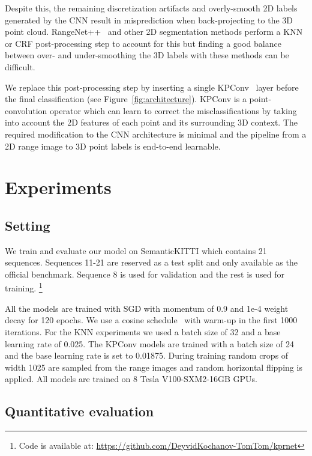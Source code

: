 \documentclass[runningheads]{llncs}
\begin{document}
Despite this, the remaining discretization artifacts and overly-smooth 2D labels generated by the CNN result in misprediction when back-projecting to the 3D point cloud. RangeNet++~\cite{rangenet} and other 2D segmentation methods perform a KNN or CRF post-processing step to account for this but finding a good balance between over- and under-smoothing the 3D labels with these methods can be difficult.

We replace this post-processing step by inserting a single KPConv~\cite{KPConv} layer before the final classification (see Figure~\ref{fig:architecture}). KPConv is a point-convolution operator which can learn to correct the misclassifications by taking into account the 2D features of each point and its surrounding 3D context. The required modification to the CNN architecture is minimal and the pipeline from a 2D range image to 3D point labels is end-to-end learnable.

\section{Experiments}
\subsection{Setting}
We train and evaluate our model on SemanticKITTI which contains 21 sequences. Sequences 11-21 are reserved as a test split and only available as the official benchmark. Sequence 8 is used for validation and the rest is used for training. \footnote{Code is available at: \url{https://github.com/DeyvidKochanov-TomTom/kprnet}} 

All the models are trained with SGD with momentum of 0.9 and 1e-4 weight decay for 120 epochs. We use a cosine schedule~\cite{cosine} with warm-up in the first 1000 iterations. For the KNN experiments we used a batch size of 32 and a base learning rate of 0.025. The KPConv models are trained with a batch size of 24 and the base learning rate is set to 0.01875. During training random crops of width 1025 are sampled from the range images and random horizontal flipping is applied. All models are trained on 8 Tesla V100-SXM2-16GB GPUs.

\subsection{Quantitative evaluation}
\end{document}
